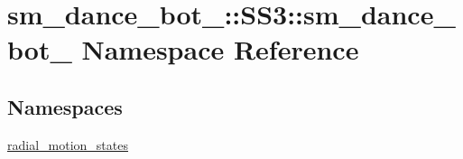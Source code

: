 \hypertarget{namespacesm__dance__bot__3_1_1SS3_1_1sm__dance__bot__3}{}\section{sm\+\_\+dance\+\_\+bot\+\_\+:\+:S\+S3\+:\+:sm\+\_\+dance\+\_\+bot\+\_ Namespace Reference}
\label{namespacesm__dance__bot__3_1_1SS3_1_1sm__dance__bot__3}
\subsection*{Namespaces}
\begin{DoxyCompactItemize}
\item 
 \hyperlink{namespacesm__dance__bot__3_1_1SS3_1_1sm__dance__bot__3_1_1radial__motion__states}{radial\+\_\+motion\+\_\+states}
\end{DoxyCompactItemize}
